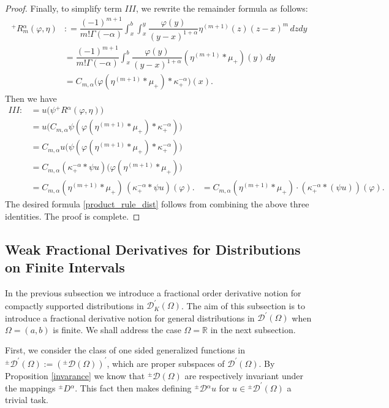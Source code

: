 \documentclass[leqno,final]{siamltex}
\numberwithin{equation}{section}
\renewcommand{\(}{\bigl(}
\renewcommand{\)}{\bigr)}
\newcommand{\R}{\mathbb{R}}
\begin{document}
\begin{proof}
        
        Finally, to simplify term $III$, we rewrite the remainder formula as follows: 
        \begin{align*}
            {^{+}}{R}{^{\alpha}_{m}}(\varphi, \eta) 
            &: = \dfrac{(-1)^{m+1}}{m! \Gamma(-\alpha)} \int_{x}^{b} \int_{x}^{y} \dfrac{\varphi(y)}{(y-x)^{1+\alpha}} \eta^{(m+1)}(z)(z-x)^{m} \,dzdy \\ 
            &= \dfrac{(-1)^{m+1}}{m!\Gamma(-\alpha)} \int_{x}^{b} \dfrac{\varphi(y)}{(y-x)^{1+\alpha}} (\eta^{(m+1)} * \mu_{+})(y)\,dy \\ 
            &= C_{m , \alpha} \bigl( \varphi (\eta^{(m+1)} * \mu_{+}) * \kappa_+^{-\alpha} \bigr)(x).
        \end{align*}
        Then we have 
        \begin{align*}
            III :&= u\bigl( \psi {^{+}}{R}{^{\alpha}}(\varphi, \eta) \bigr) \\ 
            &=  u \bigl( C_{m,\alpha} \psi (\varphi (\eta^{(m+1)} * \mu_{+} ) *\kappa^{-\alpha}_{+}) \bigr) \\
            &= C_{m,\alpha} u \bigl(\psi (\varphi (\eta^{(m+1)} * \mu_{+} ) * \kappa^{-\alpha}_{+}) \bigr) \\ 
            &=  C_{m,\alpha}  (\kappa_{+}^{-\alpha} * \psi u) \bigl( \varphi (\eta^{(m+1)} *\mu_+) \bigr)  \\
            &=C_{m,\alpha}  (\eta^{(m+1)} * \mu_{+}) \,  (\kappa_{+}^{-\alpha} * \psi u) ( \varphi).  
            &= C_{m,\alpha} (\eta^{(m+1)} * \mu_{+}) \cdot (\kappa_{+}^{-\alpha} *(\psi u)) (\varphi). 
        \end{align*}
   The desired formula \eqref{product_rule_dist} follows from combining the above three identities. The proof is complete. 
    \end{proof}


  \subsection{Weak Fractional Derivatives for Distributions on Finite Intervals}\label{sec-6.3}
  In the previous subsection we introduce a fractional order derivative notion for compactly supported 
  distributions in $\mathscr{D}_K^\prime(\Omega)$. The aim of this subsection is to introduce a fractional 
  derivative notion for general distributions in $\mathscr{D}^\prime(\Omega)$ when $\Omega=(a,b)$ is finite. 
  We shall address the case $\Omega=\R$ in the next subsection. 
  
First, we consider the class of one sided generalized functions in 
${^{\pm}}{\mathscr{D}}^\prime (\Omega):= ({^{\pm}}{\mathscr{D}} (\Omega ))^\prime$,
which are proper subspaces of ${\mathscr{D}}^\prime (\Omega)$. By Proposition \ref{invarance} we know that
${^{\pm}}{\mathscr{D}}(\Omega)$ are respectively invariant under the mappings ${^{\pm}}{D}{^{\alpha}}$. 
This fact then makes defining ${^{\pm}}{\mathcal{D}}{^{\alpha}}u$
for $u\in {^{\pm}}{\mathscr{D}}^\prime (\Omega)$ a trivial task. 
\end{document}
